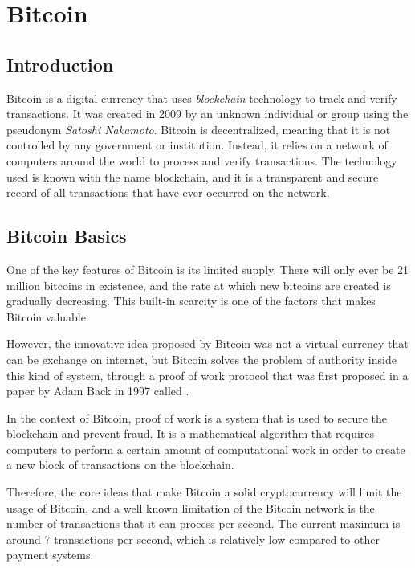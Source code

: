 \chapter{Bitcoin}

\section{Introduction}

Bitcoin is a digital currency that uses \emph{blockchain} technology to track
and verify transactions. It was created in 2009 by an unknown individual or
group using the pseudonym \emph{Satoshi Nakamoto}.
Bitcoin is decentralized, meaning that it is not controlled by any government
or institution. Instead, it relies on a network of computers around the world
to process and verify transactions.
The technology used is known with the name blockchain, and it is a transparent
and secure record of all transactions that have
ever occurred on the network.

\section{Bitcoin Basics}
\label{sec:basics}

One of the key features of Bitcoin is its limited supply. There will only ever
be 21 million bitcoins in existence, and the rate at which new bitcoins are
created is gradually decreasing. This built-in scarcity is one of the factors
that makes Bitcoin valuable.

However, the innovative idea proposed by Bitcoin was not a virtual currency that can be
exchange on internet, but Bitcoin solves the problem of authority inside this kind
of system, through a proof of work protocol that was first proposed in a paper
by Adam Back in 1997 called .

In the context of Bitcoin, proof of work is a system that is used to secure the
blockchain and prevent fraud. It is a mathematical algorithm that requires computers
to perform a certain amount of computational work in order to create a new
block of transactions on the blockchain.

Therefore, the core ideas that make Bitcoin a solid cryptocurrency will limit the
usage of Bitcoin, and a well known limitation of the Bitcoin network is the number of
transactions that it can process per second. The current maximum is around 7 transactions
per second, which is relatively low compared to other payment systems.

